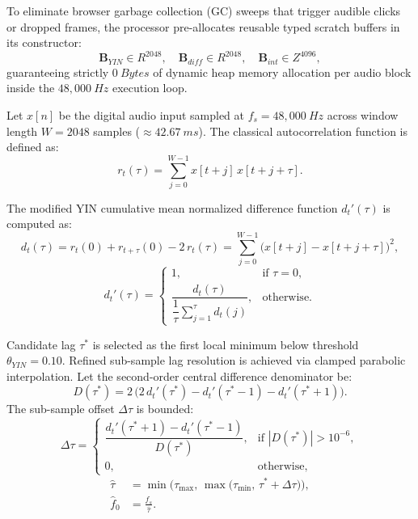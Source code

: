 \documentclass[11pt,a4paper,reqno]{article}
\def\mathrm#1{#1}%
\def\mathbb#1{#1}%
\theoremstyle{plain}
\theoremstyle{definition}
\theoremstyle{remark}
\numberwithin{equation}{section}
\begin{document}
To eliminate browser garbage collection (GC) sweeps that trigger audible clicks or dropped frames, the processor pre-allocates reusable typed scratch buffers in its constructor:
\begin{equation}
\label{eq:scratch_buffers}
\mathbf{B}_{\mathrm{YIN}} \in \mathbb{R}^{2048}, \quad \mathbf{B}_{\mathrm{diff}} \in \mathbb{R}^{2048}, \quad \mathbf{B}_{\mathrm{int}} \in \mathbb{Z}^{4096},
\end{equation}
guaranteeing strictly $0\ \mathrm{Bytes}$ of dynamic heap memory allocation per audio block inside the $48{,}000\ \mathrm{Hz}$ execution loop.

Let $x[n]$ be the digital audio input sampled at $f_s = 48{,}000\ \mathrm{Hz}$ across window length $W = 2048$ samples ($\approx 42.67\ \mathrm{ms}$). The classical autocorrelation function is defined as:
\begin{equation}
\label{eq:autocorrelation}
r_t(\tau) = \sum_{j=0}^{W-1} x[t+j] \, x[t+j+\tau].
\end{equation}

The modified YIN cumulative mean normalized difference function $d_t'(\tau)$ \cite{de2002yin} is computed as:
\begin{equation}
\label{eq:yin_difference}
d_t(\tau) = r_t(0) + r_{t+\tau}(0) - 2 \, r_t(\tau) = \sum_{j=0}^{W-1} \big( x[t+j] - x[t+j+\tau] \big)^2,
\end{equation}
\begin{equation}
\label{eq:yin_normalized}
d_t'(\tau) = \begin{cases}
1, & \text{if } \tau = 0, \\
\dfrac{d_t(\tau)}{\dfrac{1}{\tau} \sum_{j=1}^\tau d_t(j)}, & \text{otherwise}.
\end{cases}
\end{equation}

Candidate lag $\tau^*$ is selected as the first local minimum below threshold $\theta_{\mathrm{YIN}} = 0.10$. Refined sub-sample lag resolution is achieved via clamped parabolic interpolation. Let the second-order central difference denominator be:
\begin{equation}
\label{eq:parabolic_denom}
D(\tau^*) = 2 \, \big(2 \, d_t'(\tau^*) - d_t'(\tau^*-1) - d_t'(\tau^*+1)\big).
\end{equation}
The sub-sample offset $\Delta \tau$ is bounded:
\begin{equation}
\label{eq:parabolic_offset}
\Delta \tau = \begin{cases}
\dfrac{d_t'(\tau^*+1) - d_t'(\tau^*-1)}{D(\tau^*)}, & \text{if } |D(\tau^*)| > 10^{-6}, \\[0.6em]
0, & \text{otherwise},
\end{cases}
\end{equation}
\begin{align}
\label{eq:clamped_tau}
\hat{\tau} &= \min\Big(\tau_{\max}, \, \max\big(\tau_{\min}, \, \tau^* + \Delta \tau\big)\Big), \\
\label{eq:exact_pitch_hz}
\hat{f}_0 &= \frac{f_s}{\hat{\tau}}.
\end{align}
\end{document}
